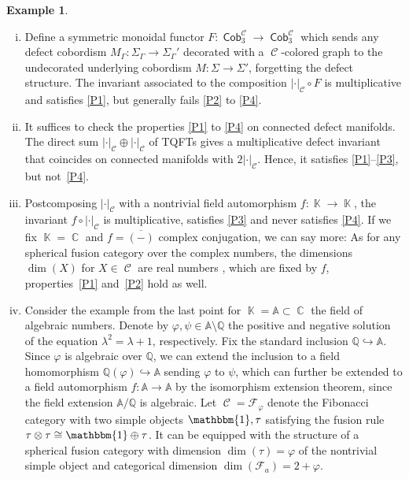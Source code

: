 \documentclass[pdftex]{sigma}
\DeclareMathOperator{\K}{\mathbb{K}}
\DeclareMathOperator{\C}{\mathbb{C}}
\DeclareMathOperator{\Cob}{\mathsf{Cob}}
\DeclareMathOperator{\calc}{\mathcal{C}}
\numberwithin{equation}{section}
\theoremstyle{definition}
\newtheorem{Example}[Example]{Example}
\begin{document}
\begin{Example}
\begin{enumerate}[(i)]
 \item \label{itemExProp} Define a symmetric monoidal functor $F\colon \Cob_3^{\calc} \rightarrow \Cob_3^{\calc}$ which sends any defect cobordism $M_{\Gamma}\colon \Sigma_{\Gamma} \rightarrow \Sigma_{\Gamma}'$ decorated with a $\calc$-colored graph to the undecorated underlying cobordism $M\colon \Sigma \rightarrow \Sigma'$, forgetting the defect structure. The invariant associated to the composition $|\cdot|_{\calc} \circ F$ is multiplicative and satisfies \ref{P1}, but generally fails \ref{P2} to \ref{P4}.
 \item It suffices to check the properties \ref{P1} to \ref{P4} on connected defect manifolds. The direct sum $|\cdot|_{\calc} \oplus |\cdot|_{\calc}$ of TQFTs gives a multiplicative defect invariant that coincides on connected manifolds with $2|\cdot|_{\calc}$. Hence, it satisfies \ref{P1}--\ref{P3}, but not~\ref{P4}.
 \item Postcomposing $| \cdot |_{\calc}$ with a nontrivial field automorphism $f\colon \K \rightarrow \K$, the invariant $f \circ | \cdot |_{\calc}$ is multiplicative, satisfies \ref{P3} and never satisfies \ref{P4}. If we fix $\K = \C$ and $f = \overline{(-)}$ complex conjugation, we can say more: As for any spherical fusion category over the complex numbers, the dimensions $\dim(X)$ for $X \in \calc$ are real numbers \cite[Corollary~2.10]{ENO}, which are fixed by $f$, properties~\ref{P1} and~\ref{P2} hold as well.
 \item \label{itemAlg} Consider the example from the last point for $\K = \mathbb{A} \subset \C$ the field of algebraic numbers. Denote by $\varphi, \psi \in \mathbb{A}\setminus \mathbb{Q}$ the positive and negative solution of the equation $\lambda^2 = \lambda + 1$, respectively. Fix the standard inclusion $\mathbb{Q} \hookrightarrow \mathbb{A}$. Since $\varphi$ is algebraic over $\mathbb{Q}$, we can extend the inclusion to a field homomorphism $\mathbb{Q}(\varphi) \hookrightarrow \mathbb{A}$ sending $\varphi$ to $\psi$, which can further be extended to a field automorphism $f\colon \mathbb{A} \rightarrow \mathbb{A}$ by the isomorphism extension theorem, since the field extension $\mathbb{A}/\mathbb{Q}$ is algebraic. Let $\calc = \mathcal{F}_{\varphi}$ denote the Fibonacci category with two simple objects $\mathbbm{1}, \tau$ satisfying the fusion rule $\tau \otimes \tau \cong \mathbbm{1} \oplus \tau$. It can be equipped with the structure of a spherical fusion category with dimension $\dim(\tau) = \varphi$ of the nontrivial simple object and categorical dimension $\dim(\mathcal{F}_a) = 2 + \varphi$.


\end{enumerate}
\end{Example}
\end{document}
